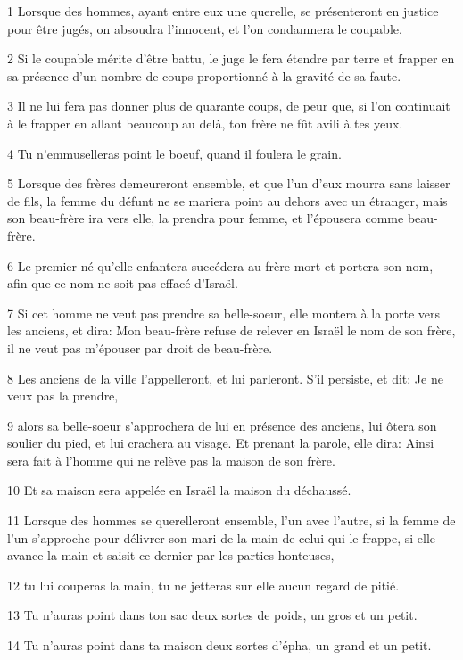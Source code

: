 \par 1 Lorsque des hommes, ayant entre eux une querelle, se présenteront en justice pour être jugés, on absoudra l'innocent, et l'on condamnera le coupable.
\par 2 Si le coupable mérite d'être battu, le juge le fera étendre par terre et frapper en sa présence d'un nombre de coups proportionné à la gravité de sa faute.
\par 3 Il ne lui fera pas donner plus de quarante coups, de peur que, si l'on continuait à le frapper en allant beaucoup au delà, ton frère ne fût avili à tes yeux.
\par 4 Tu n'emmuselleras point le boeuf, quand il foulera le grain.
\par 5 Lorsque des frères demeureront ensemble, et que l'un d'eux mourra sans laisser de fils, la femme du défunt ne se mariera point au dehors avec un étranger, mais son beau-frère ira vers elle, la prendra pour femme, et l'épousera comme beau-frère.
\par 6 Le premier-né qu'elle enfantera succédera au frère mort et portera son nom, afin que ce nom ne soit pas effacé d'Israël.
\par 7 Si cet homme ne veut pas prendre sa belle-soeur, elle montera à la porte vers les anciens, et dira: Mon beau-frère refuse de relever en Israël le nom de son frère, il ne veut pas m'épouser par droit de beau-frère.
\par 8 Les anciens de la ville l'appelleront, et lui parleront. S'il persiste, et dit: Je ne veux pas la prendre,
\par 9 alors sa belle-soeur s'approchera de lui en présence des anciens, lui ôtera son soulier du pied, et lui crachera au visage. Et prenant la parole, elle dira: Ainsi sera fait à l'homme qui ne relève pas la maison de son frère.
\par 10 Et sa maison sera appelée en Israël la maison du déchaussé.
\par 11 Lorsque des hommes se querelleront ensemble, l'un avec l'autre, si la femme de l'un s'approche pour délivrer son mari de la main de celui qui le frappe, si elle avance la main et saisit ce dernier par les parties honteuses,
\par 12 tu lui couperas la main, tu ne jetteras sur elle aucun regard de pitié.
\par 13 Tu n'auras point dans ton sac deux sortes de poids, un gros et un petit.
\par 14 Tu n'auras point dans ta maison deux sortes d'épha, un grand et un petit.
